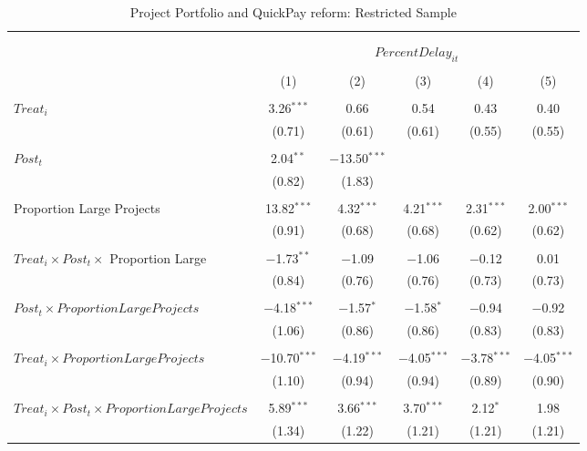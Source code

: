 \documentclass[
]{article}
\begin{document}
\begin{table}[H] \centering 
  \caption{Project Portfolio and QuickPay reform: Restricted Sample} 
  \label{} 
\small 
\begin{tabular}{@{\extracolsep{-2pt}}lccccc} 
\\[-1.8ex]\hline 
\hline \\[-1.8ex] 
\\[-1.8ex] & \multicolumn{5}{c}{$PercentDelay_{it}$  } \\ 
\\[-1.8ex] & (1) & (2) & (3) & (4) & (5)\\ 
\hline \\[-1.8ex] 
 $Treat_i$ & 3.26$^{***}$ & 0.66 & 0.54 & 0.43 & 0.40 \\ 
  & (0.71) & (0.61) & (0.61) & (0.55) & (0.55) \\ 
  & & & & & \\ 
 $Post_t$ & 2.04$^{**}$ & $-$13.50$^{***}$ &  &  &  \\ 
  & (0.82) & (1.83) &  &  &  \\ 
  & & & & & \\ 
 Proportion Large Projects & 13.82$^{***}$ & 4.32$^{***}$ & 4.21$^{***}$ & 2.31$^{***}$ & 2.00$^{***}$ \\ 
  & (0.91) & (0.68) & (0.68) & (0.62) & (0.62) \\ 
  & & & & & \\ 
 $Treat_i \times Post_t \times$ Proportion Large & $-$1.73$^{**}$ & $-$1.09 & $-$1.06 & $-$0.12 & 0.01 \\ 
  & (0.84) & (0.76) & (0.76) & (0.73) & (0.73) \\ 
  & & & & & \\ 
 $Post_t \times Proportion Large Projects$ & $-$4.18$^{***}$ & $-$1.57$^{*}$ & $-$1.58$^{*}$ & $-$0.94 & $-$0.92 \\ 
  & (1.06) & (0.86) & (0.86) & (0.83) & (0.83) \\ 
  & & & & & \\ 
 $Treat_i \times Proportion Large Projects$ & $-$10.70$^{***}$ & $-$4.19$^{***}$ & $-$4.05$^{***}$ & $-$3.78$^{***}$ & $-$4.05$^{***}$ \\ 
  & (1.10) & (0.94) & (0.94) & (0.89) & (0.90) \\ 
  & & & & & \\ 
 $Treat_i \times Post_t \times Proportion Large Projects$ & 5.89$^{***}$ & 3.66$^{***}$ & 3.70$^{***}$ & 2.12$^{*}$ & 1.98 \\ 
  & (1.34) & (1.22) & (1.21) & (1.21) & (1.21) \\ 

\end{tabular}
\end{table}
\end{document}
